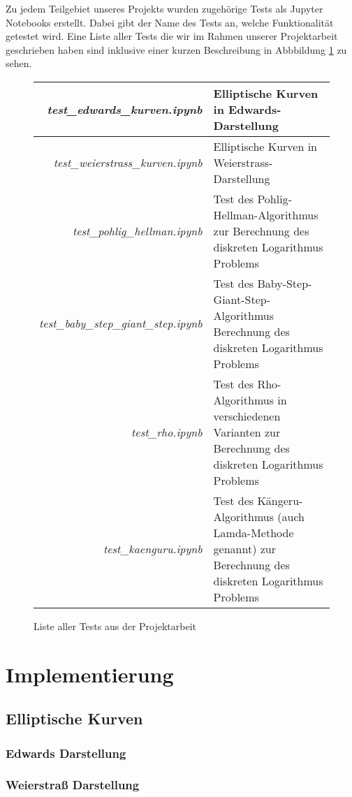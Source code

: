 \documentclass{scrartcl}
\begin{document}
Zu jedem Teilgebiet unseres Projekts wurden zugehörige Tests als Jupyter Notebooks erstellt. Dabei gibt der Name des Tests an, welche Funktionalität getestet wird. Eine Liste aller Tests die wir im Rahmen unserer Projektarbeit geschrieben haben sind inklusive einer kurzen Beschreibung in Abbbildung \ref{fig:tests} zu sehen.
\begin{figure}[h]
 \centering
 \renewcommand{\arraystretch}{1.5}
 \begin{tabular}{r|p{8cm}}
  \emph{test\_edwards\_kurven.ipynb} & Elliptische Kurven in Edwards-Darstellung  \\
  \hline \emph{test\_weierstrass\_kurven.ipynb} & Elliptische Kurven in Weierstrass-Darstellung \\
  \hline \emph{test\_pohlig\_hellman.ipynb} & Test des Pohlig-Hellman-Algorithmus zur Berechnung des diskreten Logarithmus Problems \\
  \hline \emph{test\_baby\_step\_giant\_step.ipynb} & Test des Baby-Step-Giant-Step-Algorithmus Berechnung des diskreten Logarithmus Problems \\
  \hline \emph{test\_rho.ipynb} & Test des Rho-Algorithmus in verschiedenen Varianten zur Berechnung des diskreten Logarithmus Problems \\
  \hline \emph{test\_kaenguru.ipynb} & Test des Kängeru-Algorithmus (auch Lamda-Methode genannt) zur Berechnung des diskreten Logarithmus Problems \\
 \end{tabular}
 \renewcommand{\arraystretch}{1}
 \caption{Liste aller Tests aus der Projektarbeit}
 \label{fig:tests}
\end{figure}


\section{Implementierung}
\label{sec:implementierung}

\subsection{Elliptische Kurven}
\label{sec:elliptische_kurven}

\subsubsection{Edwards Darstellung}
\label{sec:edwards_kurven}

\subsubsection{Weierstraß Darstellung}
\label{sec:weierstrass_kurven}
\end{document}
